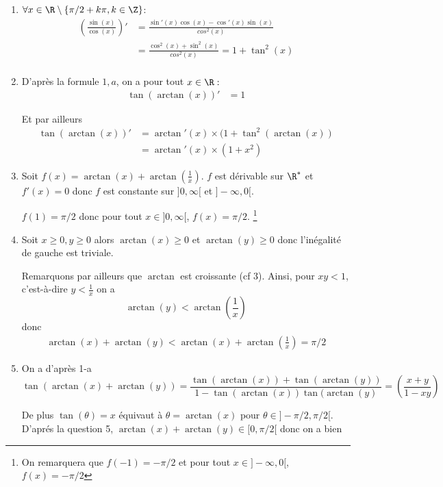 \begin{correction}
\begin{enumerate}
\begin{enumerate}
\end{enumerate}


\item $\forall x\in \R\setminus \{ \pi/2 +k\pi, k\in \Z\}$:
\begin{align*}
\left(\frac{\sin(x)}{\cos(x)}\right)'&=\frac{\sin'(x)\cos(x)-\cos'(x)\sin(x)}{cos^2(x)}\\
&=\frac{\cos^2(x)+\sin^2(x)}{cos^2(x)} =1+\tan^2(x)\\
\end{align*}


\item D'après la formule $1,a$, on a pour tout $x \in \R:$
\begin{align*}
\tan(\arctan(x))' &=1
\end{align*}

Et par ailleurs 
\begin{align*}
\tan(\arctan(x))' &=\arctan'(x) \times (1+\tan^2(\arctan(x))\\
				&=\arctan'(x) \times (1+x^2)
\end{align*}



\item 
Soit $f(x)=\arctan(x)+\arctan(\frac{1}{x})$. $f$ est dérivable  sur $\R^*$ et $f'(x)=0$ donc $f$ est constante sur $]0, \infty [$ et $]-\infty , 0[$. 

$f(1)=\pi/2$ donc pour tout $x\in ]0, \infty [$, $f(x)=\pi/2$. 
\footnote{On remarquera que $f(-1)=-\pi/2$ et pour tout $x\in  ]-\infty , 0[$, $f(x)=-\pi/2$}



\item Soit $x\geq0, y\geq 0$ alors $\arctan(x)\geq0$ et $\arctan(y)\geq0$ donc l'inégalité de gauche est triviale. 

Remarquons par ailleurs que $\arctan$ est croissante (cf 3). Ainsi,  
 pour $xy < 1$, c'est-à-dire $y<\frac{1}{x}$ on a 
 $$\arctan(y)< \arctan(\frac{1}{x})$$
 donc 
 \begin{align*}
  \arctan(x)+\arctan(y)<\arctan(x)+\arctan(\frac{1}{x} )=\pi/2
 \end{align*}




\item On  a d'après 1-a$$\tan(\arctan(x)+\arctan(y) ) =\frac{\tan(\arctan(x))+\tan(\arctan(y))}{1-\tan(\arctan(x)) \tan(\arctan(y)}=\left(\frac{x+y}{1-xy}\right)$$


De plus $\tan(\theta)=x$ équivaut à  $\theta =\arctan (x)$ pour $\theta\in ]-\pi/2, \pi/2[$. D'aprés la question 5, $\arctan(x)+\arctan(y)\in [0, \pi/2[$ donc on a bien 



\end{enumerate}
\end{correction}
